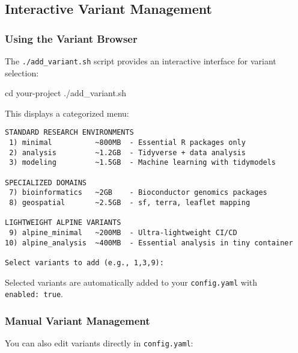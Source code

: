 \documentclass[
]{article}
\newenvironment{Shaded}{\begin{snugshade}}{\end{snugshade}}
\newcommand{\BuiltInTok}[1]{#1}
\newcommand{\ExtensionTok}[1]{#1}
\newcommand{\NormalTok}[1]{#1}
\begin{document}
\subsection{Interactive Variant
Management}\label{interactive-variant-management}

\subsubsection{Using the Variant
Browser}\label{using-the-variant-browser}

The \texttt{./add\_variant.sh} script provides an interactive interface
for variant selection:

\begin{Shaded}
\begin{Highlighting}[]
\BuiltInTok{cd}\NormalTok{ your{-}project}
\ExtensionTok{./add\_variant.sh}
\end{Highlighting}
\end{Shaded}

This displays a categorized menu:

\begin{verbatim}
STANDARD RESEARCH ENVIRONMENTS
 1) minimal          ~800MB  - Essential R packages only
 2) analysis         ~1.2GB  - Tidyverse + data analysis
 3) modeling         ~1.5GB  - Machine learning with tidymodels

SPECIALIZED DOMAINS
 7) bioinformatics   ~2GB    - Bioconductor genomics packages
 8) geospatial       ~2.5GB  - sf, terra, leaflet mapping

LIGHTWEIGHT ALPINE VARIANTS
 9) alpine_minimal   ~200MB  - Ultra-lightweight CI/CD
10) alpine_analysis  ~400MB  - Essential analysis in tiny container

Select variants to add (e.g., 1,3,9):
\end{verbatim}

Selected variants are automatically added to your \texttt{config.yaml}
with \texttt{enabled:\ true}.

\subsubsection{Manual Variant
Management}\label{manual-variant-management}

You can also edit variants directly in \texttt{config.yaml}:
\end{document}
